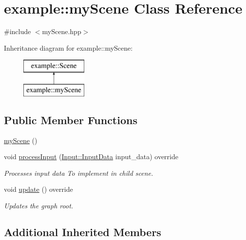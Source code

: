 \hypertarget{classexample_1_1my_scene}{}\section{example\+:\+:my\+Scene Class Reference}
\label{classexample_1_1my_scene}


{\ttfamily \#include $<$my\+Scene.\+hpp$>$}

Inheritance diagram for example\+:\+:my\+Scene\+:\begin{figure}[H]
\begin{center}
\leavevmode
\includegraphics[height=2.000000cm]{classexample_1_1my_scene}
\end{center}
\end{figure}
\subsection*{Public Member Functions}
\begin{DoxyCompactItemize}
\item 
\mbox{\hyperlink{classexample_1_1my_scene_abfdb48523181cb57fbc8106c835890b9}{my\+Scene}} ()
\item 
void \mbox{\hyperlink{classexample_1_1my_scene_a61a6d862d5c0b1ef8e31daa089699bd4}{process\+Input}} (\mbox{\hyperlink{classexample_1_1_input_af6bf4fd763ca01bd106ca3b03f162e3d}{Input\+::\+Input\+Data}} input\+\_\+data) override
\begin{DoxyCompactList}\small\item\em Processes input data To implement in child scene. \end{DoxyCompactList}\item 
void \mbox{\hyperlink{classexample_1_1my_scene_a56843ecc84a14a7938897baa09b29e3f}{update}} () override
\begin{DoxyCompactList}\small\item\em Updates the graph root. \end{DoxyCompactList}\end{DoxyCompactItemize}
\subsection*{Additional Inherited Members}


